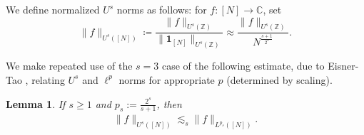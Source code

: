 \documentclass[12pt,leqno]{amsart}
\numberwithin{equation}{section}
\newtheorem{lemma}[equation]{Lemma}
\theoremstyle{definition}
\theoremstyle{plain}
\begin{document}
	We define normalized $U^s$ norms as follows: for $f \colon [N] \to \mathbb C$, 
	set 
	\begin{equation}
		\lVert f \rVert_{U^s([N]) } \coloneqq  
		\frac{\| f \|_{U^s(\mathbb{Z})}}{\lVert \mathbf{1}_{[N]} \rVert_{U^s(\mathbb Z) }} \approx \frac{\| f \|_{U^s(\mathbb{Z})}}{N^{\frac{s+1}{2^s}}}.
	\end{equation}
	
	We make repeated use of the $s=3$ case of the following estimate, due to Eisner-Tao \cite{ET}, relating $U^s$ and $\ell^p$ norms for appropriate $p$ (determined by scaling).
	
	\begin{lemma}\label{l:ET}
		If $s\geq1$ and $p_s:=\frac{2^s}{s+1}$, then
		\begin{align}
			\| f \|_{U^s([N])} \lesssim_s \| f \|_{L^{p_s}([N])}.
		\end{align}
	\end{lemma}
	
\end{document}
